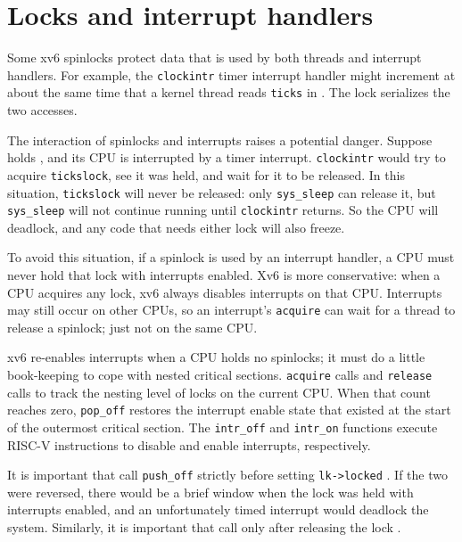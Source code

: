 \section{Locks and interrupt handlers}
\label{s:lockinter}

Some xv6 spinlocks protect data that is used by
both threads and interrupt handlers.
For example, the
\lstinline{clockintr}
timer interrupt handler might increment
at about the same time that a kernel
thread reads
\lstinline{ticks} 
in
.
The lock
serializes the two accesses.

The interaction of spinlocks and interrupts raises a potential danger.
Suppose
holds
,
and its CPU is interrupted by a timer interrupt.
\lstinline{clockintr}
would try to acquire
\lstinline{tickslock},
see it was held, and wait for it to be released.
In this situation,
\lstinline{tickslock}
will never be released: only
\lstinline{sys_sleep}
can release it, but
\lstinline{sys_sleep}
will not continue running until
\lstinline{clockintr}
returns.
So the CPU will deadlock, and any code
that needs either lock will also freeze.

To avoid this situation, if a spinlock is used by an interrupt handler,
a CPU must never hold that lock with interrupts enabled.
Xv6 is more conservative: when a CPU acquires any
lock, xv6 always disables interrupts on that CPU.
Interrupts may still occur on other CPUs, so 
an interrupt's
\lstinline{acquire}
can wait for a thread to release a spinlock; just not on the same CPU.

xv6 re-enables interrupts when a CPU holds no spinlocks; it must
do a little book-keeping to cope with nested critical sections.
\lstinline{acquire}
calls
and
\lstinline{release}
calls
to track the nesting level of locks on the current CPU.
When that count reaches zero,
\lstinline{pop_off} 
restores the interrupt enable state that existed 
at the start of the outermost critical section.
The
\lstinline{intr_off}
and
\lstinline{intr_on}
functions execute RISC-V instructions to disable and enable
interrupts, respectively.

It is important that
call
\lstinline{push_off}
strictly before setting
\lstinline{lk->locked}
.
If the two were reversed, there would be
a brief window when the lock
was held with interrupts enabled, and
an unfortunately timed interrupt would deadlock the system.
Similarly, it is important that
call
only after 
releasing the lock
.


